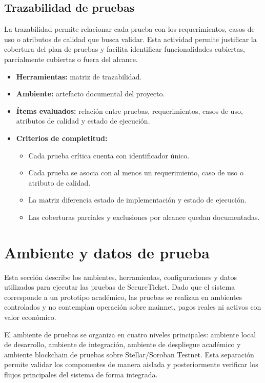 \documentclass[12pt,letterpaper]{article}
\newcommand{\NombreProyecto}{SecureTicket}
\begin{document}
\subsection{Trazabilidad de pruebas}

La trazabilidad permite relacionar cada prueba con los requerimientos, casos de uso o atributos de calidad que busca validar. Esta actividad permite justificar la cobertura del plan de pruebas y facilita identificar funcionalidades cubiertas, parcialmente cubiertas o fuera del alcance.

\begin{itemize}
    \item \textbf{Herramientas:} matriz de trazabilidad.
    \item \textbf{Ambiente:} artefacto documental del proyecto.
    \item \textbf{Ítems evaluados:} relación entre pruebas, requerimientos, casos de uso, atributos de calidad y estado de ejecución.
    \item \textbf{Criterios de completitud:}
    \begin{itemize}
        \item Cada prueba crítica cuenta con identificador único.
        \item Cada prueba se asocia con al menos un requerimiento, caso de uso o atributo de calidad.
        \item La matriz diferencia estado de implementación y estado de ejecución.
        \item Las coberturas parciales y exclusiones por alcance quedan documentadas.
    \end{itemize}
\end{itemize}


\section{Ambiente y datos de prueba}

Esta sección describe los ambientes, herramientas, configuraciones y datos utilizados para ejecutar las pruebas de \NombreProyecto{}. Dado que el sistema corresponde a un prototipo académico, las pruebas se realizan en ambientes controlados y no contemplan operación sobre mainnet, pagos reales ni activos con valor económico.

El ambiente de pruebas se organiza en cuatro niveles principales: ambiente local de desarrollo, ambiente de integración, ambiente de despliegue académico y ambiente blockchain de pruebas sobre Stellar/Soroban Testnet. Esta separación permite validar los componentes de manera aislada y posteriormente verificar los flujos principales del sistema de forma integrada.
\end{document}
